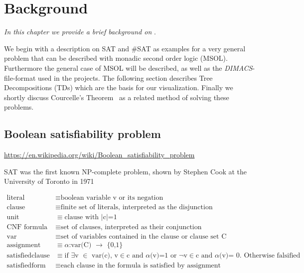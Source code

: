 \documentclass[a4paper, 12pt]{scrartcl}
\begin{document}
\newpage
\section{Background}
\textit{In this chapter we provide a brief background on }.

We begin with a description on SAT and \#SAT as examples for a very general problem that can be described with monadic second order logic (MSOL).
Furthermore the general case of MSOL will be described, as well as the \textit{DIMACS}-file-format used in the projects.
The following section describes Tree Decompositions (TDs) which are the basis for our visualization. 
Finally we shortly discuss Courcelle's Theorem~\cite{Courcelle2012} as a related method of solving these problems.

\subsection{Boolean satisfiability problem}
\url{https://en.wikipedia.org/wiki/Boolean_satisfiability_problem}

SAT was the first known NP-complete problem, shown by Stephen Cook at the University of Toronto in 1971 \cite{SAT1971}

\begin{align*}
\text{literal}&\equiv \text{boolean variable v or its negation} \\
\text{clause}&\equiv \text{finite set of literals, interpreted as the disjunction} \\
\text{unit}&\equiv \text{clause with $|$c$|$=1} \\
\text{CNF formula}&\equiv \text{set of clauses, interpreted as their conjunction} \\
\text{var}&\equiv \text{set of variables contained in the clause or clause set C} \\
\text{assignment}&\equiv \text{$\alpha $:var(C) $\to $ \{0,1\}} \\
\text{satisfiedclause}&\equiv \text{if $\exists $v $\in $ var(c), v$\in $c and $\alpha $(v)=1 or $\neg $v$\in $c and $\alpha $(v)= 0. Otherwise falsified}\\ 
\text{satisfiedform}&\equiv \text{each clause in the formula is satisfied by assignment} \\
\end{align*}
\end{document}
